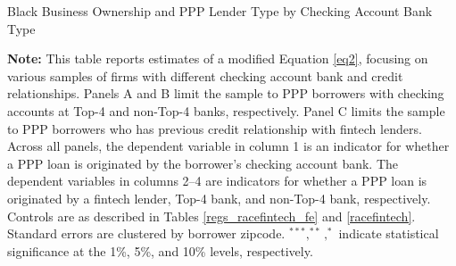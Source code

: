 \documentclass[11pt]{article}
\begin{document}
\newpage
\begin{table}[H]
	\caption{Black Business Ownership and PPP Lender Type by Checking Account Bank Type}\label{regs_bychecking}
	\begin{adjustbox}{width=.98\linewidth, center}
		
	\end{adjustbox}
	\begin{minipage}{\textwidth} \medskip
		\footnotesize{{\bf Note: }This table reports estimates of a modified Equation \ref{eq2}, focusing on various samples of firms with different checking account bank and credit relationships. Panels A and B limit the sample to PPP borrowers with checking accounts at Top-4 and non-Top-4 banks, respectively. Panel C limits the sample to PPP borrowers who has previous credit relationship with fintech lenders. Across all panels, the dependent variable in column 1 is an indicator for whether a PPP loan is originated by the borrower's checking account bank. The dependent variables in columns 2--4 are indicators for whether a PPP loan is originated by a fintech lender, Top-4 bank, and non-Top-4 bank, respectively. Controls are as described in Tables \ref{regs_racefintech_fe} and \ref{racefintech}. Standard errors are clustered by borrower zipcode. $^{***}, ^{**}, ^{*}$ indicate statistical significance at the 1\%, 5\%, and 10\% levels, respectively.}
	\end{minipage}
\end{table}
\end{document}
